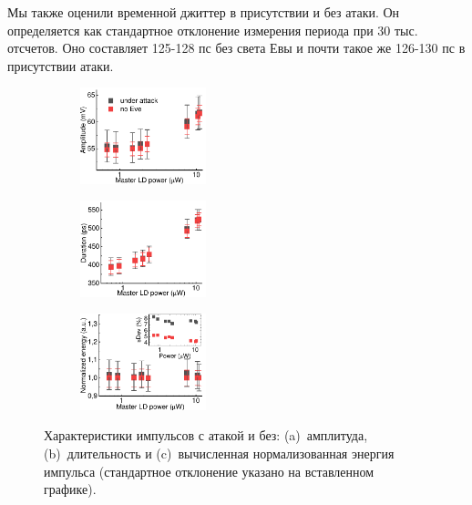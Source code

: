Мы также оценили временной джиттер в присутствии и без атаки. Он определяется как стандартное отклонение измерения периода при 30 тыс. отсчетов. Оно составляет 125-128 пс  без света Евы и почти такое же 126-130 пс в присутствии атаки. 
\begin{figure}
\begin{subfigure}%
	\centering
	\includegraphics[width=0.4\textwidth]{images/amplitude_change.pdf}
	\caption{}
\end{subfigure}
\hfill
\begin{subfigure}%
	\centering
	\includegraphics[width=0.4\textwidth]{images/duration_change.pdf}
	\caption{}
\end{subfigure}
\hfill
\begin{subfigure}%
	\centering
	\includegraphics[width=0.4\textwidth]{images/area_under_attack.pdf}
	\caption{}
\end{subfigure}
\caption{Характеристики импульсов с атакой и без: (a)~амплитуда, (b)~длительность и (c)~вычисленная нормализованная энергия импульса (стандартное отклонение указано на вставленном графике).}
\label{fig:area}
\end{figure}
